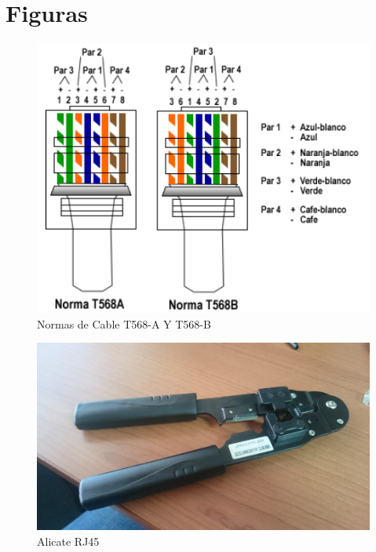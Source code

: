 \documentclass[onecolumn,11pts]{IEEEtran}
\begin{document}
\newpage

\section{Figuras}
\begin{figure}[h!]
\centering
 \includegraphics[scale=0.4]{Screenshot_2}
\caption{Normas de Cable T568-A Y T568-B}
\label{fig:Screenshot_2}
\end{figure}

\begin{figure}[h!]
\centering
 \includegraphics[scale=0.04]{DSC_0633}
\caption{Alicate RJ45}
\label{fig:DSC_0633}
\end{figure}
\end{document}
